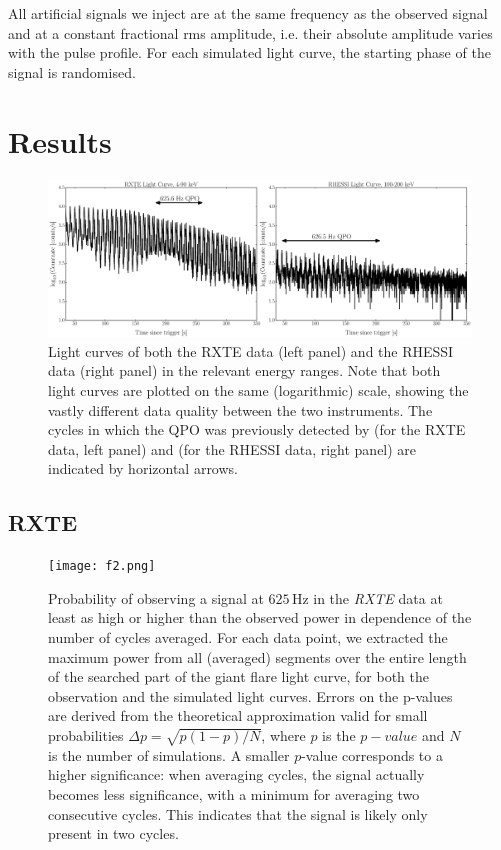\documentclass{emulateapj}
\begin{document}
All artificial signals we inject are at the same frequency as the observed signal and at a constant fractional rms amplitude, i.e. their absolute amplitude varies with the pulse profile. For each simulated light curve, the starting phase of the signal is randomised. 

\section{Results}
\label{sec:results}

\begin{figure}[htbp]
\begin{center}
\includegraphics[width=18cm]{f1.eps}
\caption{Light curves of both the RXTE data (left panel) and the RHESSI data (right panel) in the relevant energy ranges. Note that both light curves are plotted on the same (logarithmic) scale, showing the vastly different data quality between the two instruments. 
The cycles in which the QPO was previously detected by \citet{Strohmayer06} (for the RXTE data, left panel) and \citet{Watts06} (for the RHESSI data, right panel) are indicated by horizontal arrows.}
\label{fig:lcs}
\end{center}
\end{figure}

\subsection{RXTE}
\label{sec:rxte_results}

\begin{figure}[htbp]
\begin{center}
\texttt{[image: f2.png]}
\caption{Probability of observing a signal at $625 \, \mathrm{Hz}$ in the {\it RXTE} data at least as high or higher than the observed power in dependence of the number of cycles averaged. For each data point, we extracted the maximum power from all (averaged) segments over the entire length of the searched part of the giant flare light curve, for both the observation and the simulated light curves. Errors on the p-values are derived from the theoretical approximation valid for small probabilities $\Delta p = \sqrt{p (1-p)/N}$, where $p$ is the $p-value$ and $N$ is the number of simulations. A smaller $p$-value corresponds to a higher significance: when averaging cycles, the signal actually becomes less significance, with a minimum for averaging two consecutive cycles. This indicates that the signal is likely only present in two cycles.}
\label{fig:rxte_pvals}
\end{center}
\end{figure}
\end{document}
